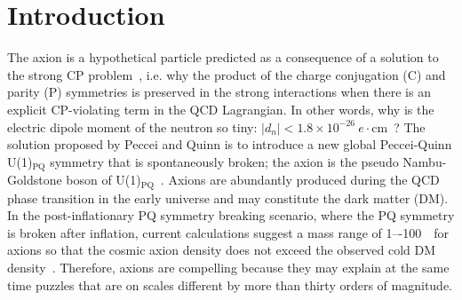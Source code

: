 \section{Introduction} \label{sec:intro}
The axion is a hypothetical particle predicted as a consequence of a  
solution to the strong CP problem~\cite{strongCPI,strongCPII,strongCPIII}, 
i.e. why the product of the charge 
conjugation (C) and parity (P) symmetries is preserved in the strong 
interactions when there is an explicit CP-violating term in the QCD 
Lagrangian. In other words, why is the electric dipole moment 
of the neutron so tiny:  
$\left|d_n\right| < 1.8 \times10^{-26}~e\cdot\mathrm{cm}$~\cite{EDM,PDG}? 
The solution proposed by Peccei and Quinn is to introduce a new global 
Peccei-Quinn U(1)$_\mathrm{PQ}$ symmetry that is spontaneously broken; the 
axion is the pseudo Nambu-Goldstone boson of 
U(1)$_\mathrm{PQ}$~\cite{strongCPI}. 
Axions are abundantly produced during the QCD phase transition in 
the early universe and may constitute the dark matter (DM). 
In the post-inflationary PQ symmetry breaking scenario, where the PQ symmetry
is broken after inflation, current calculations suggest a mass range of 
1–-100~\muevcc\ for axions so that the cosmic axion density does not exceed 
the 
observed cold DM density~\cite{QCDCalI,QCDCalII,QCDCalIII,QCDCalIV,QCDCalV,QCDCalVI,QCDCalVII,QCDCalVIII,QCDCalIX,QCDCalX,QCDCalXI,QCDCalXII,QCDCalXIII}. 
Therefore, axions are compelling because they may explain at the same 
time puzzles that are on scales different by more than thirty orders of 
magnitude. 


%
%
%

%
%
%

